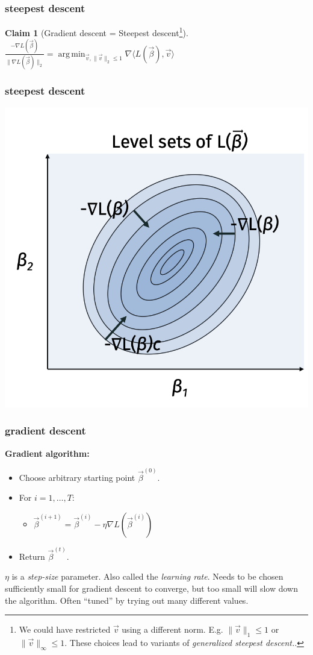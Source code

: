 \documentclass[handout,compress]{beamer}
\DeclareMathOperator*{\argmin}{arg\,min}
\newtheorem{claim}[theorem]{Claim}
\begin{document}
\begin{frame}[t]
	\frametitle{steepest descent}
	\begin{claim}[Gradient descent = Steepest descent\footnote{We could have restricted $\vec{v}$ using a different norm.  E.g. $\|\vec{v}\|_1 \leq 1$ or $\|\vec{v}\|_{\infty} \leq 1$. These choices lead to  variants of \emph{generalized steepest descent.}.}]
		$\frac{-\nabla L(\vec{\beta})}{\|\nabla L(\vec{\beta})\|_2} = \argmin_{\vec{v}, \|\vec{v}\|_2 \leq 1} \nabla \langle L(\vec{\beta}), \vec{v}\rangle$
	\end{claim}

\end{frame}

\begin{frame}[t]
	\frametitle{steepest descent}
	\begin{center}
		\includegraphics[width=.7\textwidth]{2d_example.png}
	\end{center}
\end{frame}

\begin{frame}
	\frametitle{gradient descent}
	\textbf{Gradient algorithm:}
	\begin{itemize}
		\item Choose arbitrary starting point $\vec{\beta}^{(0)}$.
		\item For $i = 1,\ldots, T$:
		\begin{itemize}
			\item $\vec{\beta}^{(i+1)} = \vec{\beta}^{(i)} - \eta \nabla L(\vec{\beta}^{(i)})$
		\end{itemize}
		\item Return $\vec{\beta}^{(t)}$.
	\end{itemize}
	
	$\eta$ is a \emph{step-size} parameter. Also called the \emph{learning rate}. Needs to be chosen sufficiently small for gradient descent to converge, but too small will slow down the algorithm. Often ``tuned'' by trying out many different values. 
\end{frame}
\end{document}
